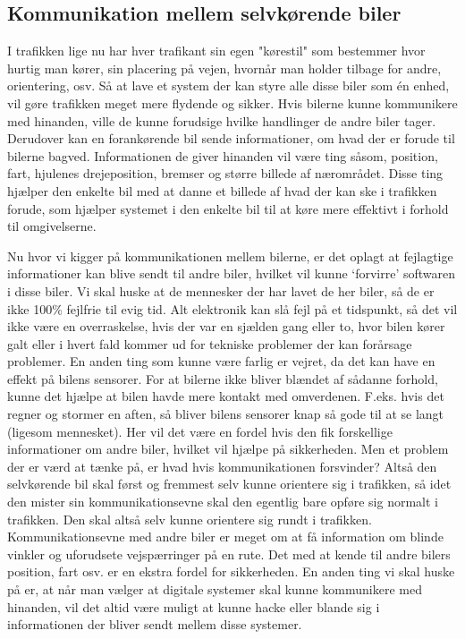 
\subsection{Kommunikation mellem selvkørende biler}

I trafikken lige nu har hver trafikant sin egen "kørestil" som bestemmer hvor hurtig man kører, sin placering på vejen, hvornår man holder tilbage for andre, orientering, osv. Så at lave et system der kan styre alle disse biler som \'en enhed, vil gøre trafikken meget mere flydende og sikker. Hvis bilerne kunne kommunikere med hinanden, ville de kunne forudsige hvilke handlinger de andre biler tager. Derudover kan en forankørende bil sende informationer, om hvad der er forude til bilerne bagved. Informationen de giver hinanden vil være ting såsom, position, fart, hjulenes drejeposition, bremser og større billede af nærområdet. Disse ting hjælper den enkelte bil med at danne et billede af hvad der kan ske i trafikken forude, som hjælper systemet i den enkelte bil til at køre mere effektivt i forhold til omgivelserne. 

Nu hvor vi kigger på kommunikationen mellem bilerne, er det oplagt at fejlagtige informationer kan blive sendt til andre biler, hvilket vil kunne `forvirre' softwaren i disse biler. Vi skal huske at de mennesker der har lavet de her biler, så de er ikke 100\% fejlfrie til evig tid. Alt elektronik kan slå fejl på et tidspunkt, så det vil ikke være en overraskelse, hvis der var en sjælden gang eller to, hvor bilen kører galt eller i hvert fald kommer ud for tekniske problemer der kan forårsage problemer. En anden ting som kunne være farlig er vejret, da det kan have en effekt på bilens sensorer. For at bilerne ikke bliver blændet af sådanne forhold, kunne det hjælpe at bilen havde mere kontakt med omverdenen. F.eks. hvis det regner og stormer en aften, så bliver bilens sensorer knap så gode til at se langt (ligesom mennesket). Her vil det være en fordel hvis den fik forskellige informationer om andre biler, hvilket vil hjælpe på sikkerheden. Men et problem der er værd at tænke på, er hvad hvis kommunikationen forsvinder? Altså den selvkørende bil skal først og fremmest selv kunne orientere sig i trafikken, så idet den mister sin kommunikationsevne skal den egentlig bare opføre sig normalt i trafikken. Den skal altså selv kunne orientere sig rundt i trafikken. Kommunikationsevne med andre biler er meget om at få information om blinde vinkler og uforudsete vejspærringer på en rute. Det med at kende til andre bilers position, fart osv. er en ekstra fordel for sikkerheden. En anden ting vi skal huske på er, at når man vælger at digitale systemer skal kunne kommunikere med hinanden, vil det altid være muligt at kunne hacke eller blande sig i informationen der bliver sendt mellem disse systemer. \cite{car_to_car}
